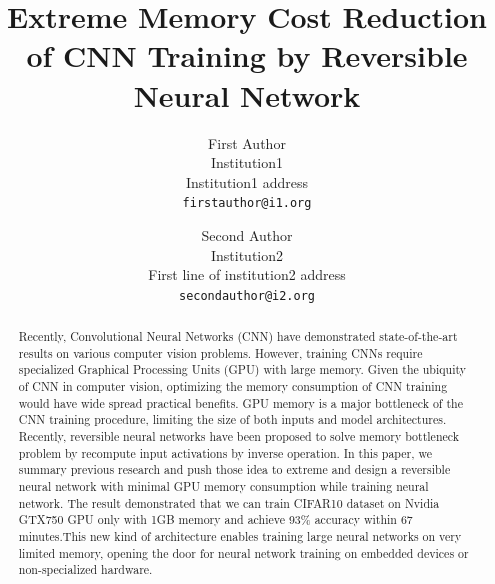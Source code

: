 \documentclass[10pt,twocolumn,letterpaper]{article}
\begin{document}
\title{Extreme Memory Cost Reduction of CNN Training by Reversible Neural Network }

\author{First Author\\
Institution1\\
Institution1 address\\
{\tt\small firstauthor@i1.org}
\and
Second Author\\
Institution2\\
First line of institution2 address\\
{\tt\small secondauthor@i2.org}
}

\maketitle
\ificcvfinal\thispagestyle{empty}\fi

\begin{abstract}
   Recently, Convolutional Neural Networks (CNN) have demonstrated state-of-the-art results on various computer vision problems. However, training CNNs require specialized Graphical Processing Units (GPU) with large memory. Given the ubiquity of CNN in computer vision, optimizing the memory consumption of CNN training would have wide spread practical benefits. GPU memory is a major bottleneck of the CNN training procedure, limiting the size of both inputs and model architectures. Recently, reversible neural networks have been proposed to solve memory bottleneck problem by recompute input activations by inverse operation. In this paper, we summary previous research and push those idea to extreme and design a reversible neural network with minimal GPU memory consumption while training neural network. The result demonstrated that we can train CIFAR10 dataset on Nvidia GTX750 GPU only with 1GB memory and achieve 93\% accuracy within 67 minutes.This new kind of architecture enables training large neural networks on very limited memory, opening the door for neural network training on embedded devices or non-specialized hardware.
   
   
\end{abstract}

\end{document}
